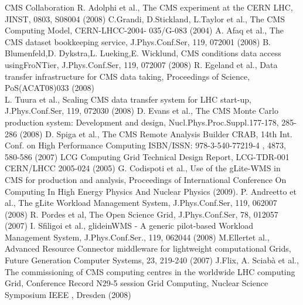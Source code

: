 
\begin{thebibliography}{}
%
%
CMS Collaboration R. Adolphi et al., The CMS experiment at the CERN LHC, JINST, 0803, S08004 (2008)
%
C.Grandi, D.Stickland, L.Taylor et al., The CMS Computing Model, CERN-LHCC-2004-
035/G-083 (2004)
%
A. Afaq et al., The CMS dataset bookkeeping service, J.Phys.Conf.Ser, 119, 072001 (2008)
%
B. Blumenfeld,D. Dykstra,L. Lueking,E. Wicklund, CMS conditions data access usingFroNTier, J.Phys.Conf.Ser, 119, 072007 (2008)
%
R. Egeland et al., Data transfer infrastructure for CMS data taking, Proceedings of Science, PoS(ACAT08)033 (2008)\\
L. Tuura et al., Scaling CMS data transfer system for LHC start-up, J.Phys.Conf.Ser, 119, 072030 (2008)
%
D. Evans et al., The CMS Monte Carlo production system: Development and design, Nucl.Phys.Proc.Suppl.177-178, 285-286 (2008)
%
D. Spiga et al., The CMS Remote Analysis Builder CRAB, 14th Int. Conf. on High Performance Computing ISBN/ISSN: 978-3-540-77219-4 , 4873, 580-586 (2007)
%
LCG Computing Grid Technical Design Report, LCG-TDR-001 CERN/LHCC 2005-024 (2005)
%
G. Codispoti et al., Use of the gLite-WMS in CMS for production and analysis, Proceedings of International Conference On Computing In High Energy Physics And Nuclear Physics (2009). 
%
 P. Andreetto et al., The gLite Workload Management System, J.Phys.Conf.Ser, 119, 062007 (2008)
%
 R. Pordes et al, The Open Science Grid, J.Phys.Conf.Ser, 78, 012057 (2007)
%
 I. Sfiligoi et al., glideinWMS - A generic pilot-based Workload Management System, J.Phys.Conf.Ser., 119, 062044 (2008)
%
 M.Ellertet al., Advanced Resource Connector middleware
  for lightweight computational Grids, Future Generation Computer Systems, 23, 219-240 (2007)
%
J.Flix, A. Sciab\`a et al., The commissioning of CMS computing centres in the worldwide LHC computing Grid, Conference Record N29-5 session Grid Computing, Nuclear Science Symposium IEEE , Dresden (2008)


\end{thebibliography}
